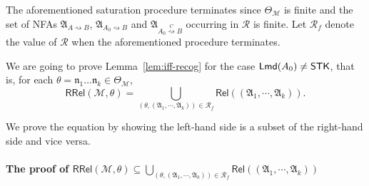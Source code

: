 \documentclass[preprint,12pt]{elsarticle}
\newcommand\Mm{{\mathcal{M} }}
\newcommand\lmd{{\sf Lmd}}
\newcommand\singletask{{\sf STK}}
\newcommand\aname{\mathfrak{n}}
\newcommand\AutReach{\mathscr{R}}
\newcommand\RLang{\mathsf{RRel}}
\newcommand\Rel{\mathsf{Rel}}
\newcommand\Aut{{\mathfrak{A} }}
\newcommand{\NFA}{\textsf{NFA}}
\begin{document}
The aforementioned saturation procedure terminates since $\Theta_\Mm$ is finite and the set of {\NFA}s $\Aut_{A\rightsquigarrow B}$, $\Aut_{A_0\rightsquigarrow B}$ and $\Aut_{A_0\stackrel{C}\rightsquigarrow B}$ occurring in $\AutReach$ is finite.
Let $\AutReach_f$ denote the value of $\AutReach$ when the aforementioned procedure terminates. 

We are going to prove Lemma~\ref{lem:iff-recog} for the case $\lmd(A_0) \neq \singletask$, that is, for each $\theta=\aname_1\dots\aname_k\in\Theta_{\Mm}$, 
%
\[\RLang(\Mm, \theta) = \bigcup \limits_{(\theta, (\Aut_1, \cdots, \Aut_k)) \in \AutReach_f} \Rel((\Aut_1, \cdots, \Aut_k)).\]

We prove the equation by showing the left-hand side is a subset of the right-hand side and vice versa. 

\paragraph*{The proof of $\RLang(\Mm, \theta) \subseteq \bigcup \limits_{(\theta, (\Aut_1, \cdots, \Aut_k)) \in \AutReach_f} \Rel((\Aut_1, \cdots, \Aut_k))$}
\end{document}
